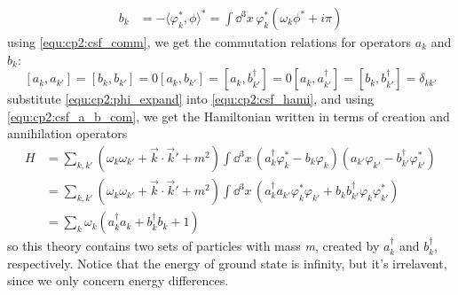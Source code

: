 \begin{problembody}
\begin{subequations}
\begin{align}
            b_k & = -\langle \varphi^\ast_k, \phi \rangle^\ast = \int \dd^3x \, \varphi^\ast_k \left(\omega_k\phi^\ast + i\pi\right)
        \end{align}
    \end{subequations}
    using \eqref{equ:cp2:csf_comm}, we get the commutation relations for operators $a_k$ and $b_k$:
    \begin{subequations}\label{equ:cp2:csf_a_b_com}
        \begin{equation}
            [a_k,a_{k'}] = [b_k, b_{k'}] = 0
        \end{equation}
        \begin{equation}
            [a_k,b_{k'}] = [a_k, b_{k'}^\dagger] = 0
        \end{equation}
        \begin{equation}
            [a_k, a_{k'}^\dagger] = [b_k, b_{k'}^\dagger] = \delta_{kk'}
        \end{equation}
    \end{subequations}
    substitute \eqref{equ:cp2:phi_expand} into \eqref{equ:cp2:csf_hami}, and using \eqref{equ:cp2:csf_a_b_com}, we get the 
    Hamiltonian written in terms of creation and annihilation operators
    \begin{align}\label{equ:cp2:csf_hami_diag}
        H & = \sum_{k, k'}\left(\omega_k\omega_{k'} + \vec{k}\cdot\vec{k}' + m^2\right)
        \int \dd^3x \, \left(a^\dagger_k\varphi^\ast_k - b_k\varphi_k\right)
        \left(a_{k'}\varphi_{k'} - b^\dagger_{k'}\varphi^\ast_{k'}\right)\nonumber\\
        & = \sum_{k, k'}\left(\omega_k\omega_{k'} + \vec{k}\cdot\vec{k}' + m^2\right)
        \int \dd^3x \, \left(a^\dagger_k a_{k'} \varphi^\ast_k \varphi_{k'} + b_k b^\dagger_{k'} \varphi_k \varphi^\ast_{k'}\right)\nonumber\\
        & = \sum_k \omega_k \left(a^\dagger_k a_k + b^\dagger_k b_k + 1\right)
    \end{align}
    so this theory contains two sets of particles with mass \textit{m}, created by $a^\dagger_k$ and $b^\dagger_k$, respectively.
    Notice that the energy of ground state is infinity, but it's irrelavent, since we only concern energy differences.


\end{problembody}
